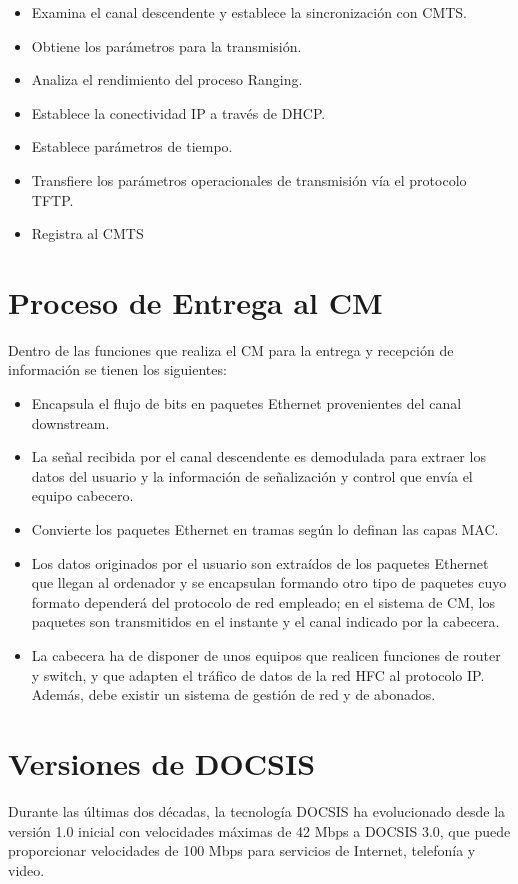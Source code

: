 \begin{itemize}
\item Examina el canal descendente y establece la sincronización con CMTS. 
\item Obtiene los parámetros para la transmisión. 
\item Analiza el rendimiento del proceso Ranging. 
\item Establece la conectividad IP a través de DHCP. 
\item Establece parámetros de tiempo. 
\item Transfiere los parámetros operacionales de transmisión vía el protocolo TFTP. 
\item Registra al CMTS
\end{itemize}

\section*{Proceso de Entrega al CM}
Dentro de las funciones que realiza el CM para la entrega y recepción de información se tienen los siguientes:
\begin{itemize}
\item Encapsula el flujo de bits en paquetes Ethernet provenientes del canal downstream.
\item La señal recibida por el canal descendente es demodulada para extraer los datos del usuario y la información de señalización y control que envía el equipo cabecero.
\item Convierte los paquetes Ethernet en tramas según lo definan las capas MAC.
\item Los datos originados por el usuario son extraídos de los paquetes Ethernet que llegan al ordenador y se encapsulan formando otro tipo de paquetes cuyo formato dependerá del protocolo de red empleado; en el sistema de CM, los paquetes son transmitidos en el instante y el canal indicado por la cabecera.
\item La cabecera ha de disponer de unos equipos que realicen funciones de router y switch, y que adapten el tráfico de datos de la red HFC al protocolo IP. Además, debe existir un sistema de gestión de red y de abonados.
\end{itemize}

\section*{Versiones de DOCSIS}

Durante las últimas dos décadas, la tecnología DOCSIS ha evolucionado desde la versión 1.0 inicial con velocidades máximas de 42 Mbps a DOCSIS 3.0, que puede proporcionar velocidades de 100 Mbps para servicios de Internet, telefonía y video.


